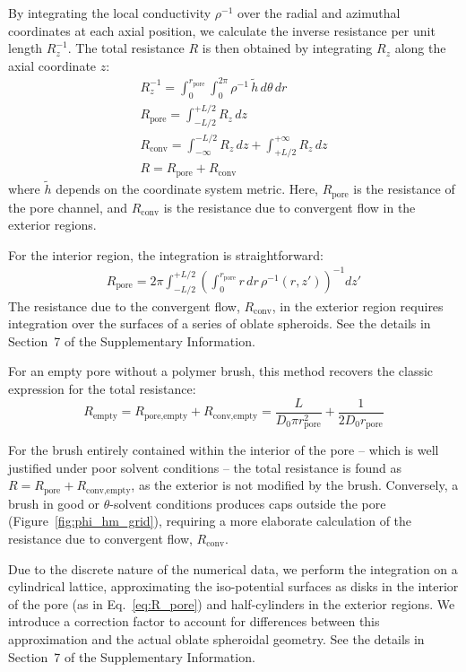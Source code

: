 \documentclass[12pt, a4paper]{article}
\begin{document}
By integrating the local conductivity $\rho^{-1}$ over the radial and azimuthal coordinates at each axial position, we calculate the inverse resistance per unit length $R_z^{-1}$.
The total resistance $R$ is then obtained by integrating $R_z$ along the axial coordinate $z$:
\begin{eqnarray}
    R_z^{-1} = \int_{0}^{r_{\text{pore}}}\int_{0}^{2\pi}\rho^{-1} \, \tilde{h} \, d\theta \, dr\\
    R_{\text{pore}} = \int_{-L/2}^{+L/2} R_z \, dz\\
    R_{\text{conv}} = \int_{-\infty}^{-L/2} R_z \, dz + \int_{+L/2}^{+\infty} R_z \, dz\\
    R = R_{\text{pore}} + R_{\text{conv}}
\end{eqnarray}
where $\tilde{h}$ depends on the coordinate system metric. Here, $R_{\textrm{pore}}$ is the resistance of the pore channel, and $R_{\textrm{conv}}$ is the resistance due to convergent flow in the exterior regions.

For the interior region, the integration is straightforward:
\begin{eqnarray}
    R_{\text{pore}} = 2\pi\int_{-L/2}^{+L/2}\left(\int_{0}^{r_{\text{pore}}} r \, dr \, \rho^{-1}(r, z')\right)^{-1} dz'
    \label{eq:R_pore}
\end{eqnarray}
The resistance due to the convergent flow, $R_{\text{conv}}$, in the exterior region requires integration over the surfaces of a series of oblate spheroids. 
See the details in Section~7 of the Supplementary Information.

For an empty pore without a polymer brush, this method recovers the classic expression for the total resistance:
\begin{equation} 
    R_{\textrm{empty}} = R_{\textrm{pore,empty}} + R_{\textrm{conv,empty}} = \frac{L}{D_0 \pi r_{\textrm{pore}}^2} + \frac{1}{2 D_0 r_{\textrm{pore}}}
\end{equation}

For the brush entirely contained within the interior of the pore -- which is well justified under poor solvent conditions -- the total resistance is found as $R = R_{\textrm{pore}} + R_{\textrm{conv,empty}}$, as the exterior is not modified by the brush.
Conversely, a brush in good or $\theta$-solvent conditions produces caps outside the pore (Figure~\ref{fig:phi_hm_grid}), requiring a more elaborate calculation of the resistance due to convergent flow, $R_{\textrm{conv}}$.

Due to the discrete nature of the numerical data, we perform the integration on a cylindrical lattice, approximating the iso-potential surfaces as disks in the interior of the pore (as in Eq.~\ref{eq:R_pore}) and half-cylinders in the exterior regions.
We introduce a correction factor to account for differences between this approximation and the actual oblate spheroidal geometry.
See the details in Section~7 of the Supplementary Information.
\end{document}
